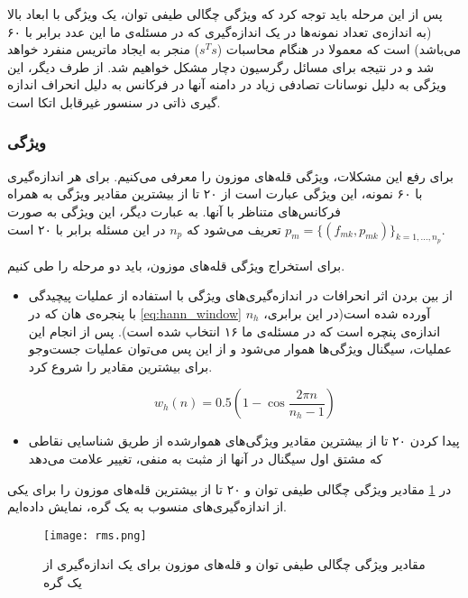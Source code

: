  پس از این مرحله باید توجه کرد که ویژگی چگالی طیفی توان، یک ویژگی با ابعاد بالا (به اندازه‌ی تعداد نمونه‌ها در یک اندازه‌گیری که در مسئله‌ی ما این عدد برابر با ۶۰ می‌باشد) است که معمولا در هنگام محاسبات ($s^Ts$) منجر به ایجاد ماتریس منفرد خواهد شد و در نتیجه برای مسائل رگرسیون دچار مشکل خواهیم شد. از طرف دیگر، این ویژگی به دلیل نوسانات تصادفی زیاد در دامنه آنها در فرکانس به دلیل انحراف اندازه گیری ذاتی در سنسور  غیرقابل اتکا است.
 
\subsubsection{ویژگی }

برای رفع این مشکلات، ویژگی قله‌های موزون را معرفی می‌کنیم. برای هر اندازه‌گیری با ۶۰ نمونه، این ویژگی عبارت است از ۲۰ تا از بیشترین مقادیر ویژگی  به همراه فرکانس‌های متناظر با آنها. به عبارت دیگر، این ویژگی به صورت $p_m = \{(f_{mk}, p_{mk})\}_{k=1, ..., n_p}$ تعریف می‌شود که $n_p$ در این مسئله برابر با ۲۰ است.

برای استخراج ویژگی قله‌های موزون، باید دو مرحله را طی کنیم.
\begin{itemize}
\item از بین بردن اثر انحرافات در اندازه‌گیری‌های ویژگی‌  با استفاده از عملیات پیچیدگی با پنجره‌ی هان که در \cref{eq:hann_window} آورده شده است(در این برابری، $n_h$ اندازه‌ی پنچره است که در مسئله‌ی ما ۱۶ انتخاب شده است). پس از انجام این عملیات، سیگنال ویژگی‌ها هموار می‌شود و از این پس می‌توان عملیات جست‌وجو برای بیشترین مقادیر را شروع کرد.

\begin{equation}
\label{eq:hann_window}
w_h(n) = 0.5 (1 - \cos{\dfrac{2\pi n}{n_h - 1}})
\end{equation}

\item پیدا کردن ۲۰ تا از بیشترین مقادیر ویژگی‌های هموارشده از طریق شناسایی نقاطی که مشتق اول سیگنال در آنها از مثبت به منفی، تغییر علامت می‌دهد

\end{itemize}

در \cref{fig:psd} مقادیر ویژگی چگالی طیفی توان و ۲۰ تا از بیشترین قله‌های موزون را برای یکی از اندازه‌گیری‌های منسوب به یک گره، نمایش داده‌ایم.

\begin{figure}[!h]
\centerline{\texttt{[image: rms.png]}}
\caption{مقادیر ویژگی چگالی طیفی توان و قله‌های موزون برای یک اندازه‌گیری از یک گره}
\label{fig:psd}
\end{figure}

